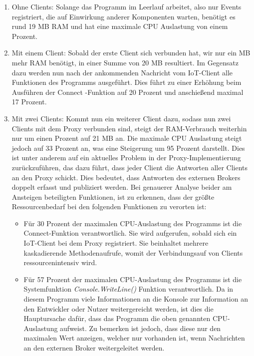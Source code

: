     \begin{enumerate}
        \item Ohne Clients:
        Solange das Programm im Leerlauf arbeitet, also nur Events registriert, die auf Einwirkung anderer Komponenten warten, benötigt es rund 19 \ac{MB} \ac{RAM} und hat eine maximale \ac{CPU} Auslastung von einem Prozent.
        \item Mit einem Client:
        Sobald der erste Client sich verbunden hat, wir nur ein \ac{MB} mehr \ac{RAM} benötigt, in einer Summe von 20 \ac{MB} resultiert. Im Gegensatz dazu werden nun nach der ankommenden Nachricht vom \ac{IoT}-Client alle Funktionen des Programms ausgeführt. Dies führt zu einer Erhöhung beim Ausführen der \glqq Connect\grqq{} -Funktion auf 20 Prozent und anschießend maximal 17 Prozent.
        \item Mit zwei Clients:
        Kommt nun ein weiterer Client dazu, sodass nun zwei Clients mit dem Proxy verbunden sind, steigt der \ac{RAM}-Verbrauch weiterhin nur um einen Prozent auf 21 \ac{MB} an. Die maximale \ac{CPU} Auslastung steigt jedoch auf 33 Prozent an, was eine Steigerung um 95 Prozent darstellt. Dies ist unter anderem auf ein aktuelles Problem in der Proxy-Implementierung %
        zurückzuführen, das dazu führt, dass jeder Client die Antworten aller Clients an den Proxy schickt. Dies bedeutet, dass Antworten des externen Brokers doppelt erfasst und publiziert werden.
        Bei genauerer Analyse beider am Ansteigen beteiligten Funktionen, ist zu erkennen, dass der größte Ressourcenbedarf bei den folgenden Funktionen zu verorten ist:
        \begin{itemize}
            \item Für 30 Prozent der maximalen \ac{CPU}-Auslastung des Programms ist die \glqq Connect\grqq -Funktion verantwortlich. Sie wird aufgerufen, sobald sich ein \ac{IoT}-Client bei dem Proxy registriert. Sie beinhaltet mehrere kaskadierende Methodenaufrufe, womit der Verbindungsauf von Clients ressourcenintensiv wird.  
            \item Für 57 Prozent der maximalen \ac{CPU}-Auslastung des Programms ist die Systemfunktion \emph{Console.WriteLine()} Funktion verantwortlich. Da in diesem Programm viele Informationen an die Konsole zur Information an den Entwickler oder Nutzer weitergereicht werden, ist dies die Hauptursache dafür, dass das Programm die oben genannten \ac{CPU}-Auslastung aufweist. Zu bemerken ist jedoch, dass diese nur den maximalen Wert anzeigen, welcher nur vorhanden ist, wenn Nachrichten an den externen Broker weitergeleitet werden.
        \end{itemize}
    \end{enumerate}
